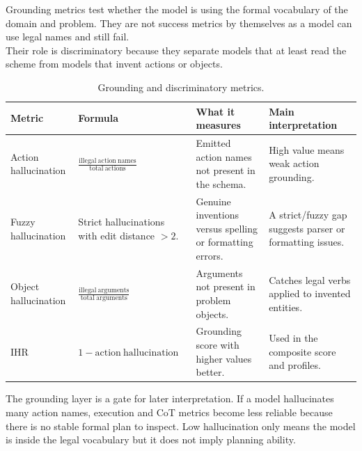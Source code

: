Grounding metrics test whether the model is using the formal vocabulary of the domain and problem. They are not success metrics by themselves as a model can use legal names and still fail.\\
Their role is discriminatory because they separate models that at least read the scheme from models that invent actions or objects.

\begin{table}[H]\small
\centering
\begin{tabularx}{\linewidth}{@{}l l Y Y@{}}
\toprule
\textbf{Metric} & \textbf{Formula} & \textbf{What it measures} & \textbf{Main interpretation}\\
\midrule
Action hallucination & \(\frac{\mathrm{illegal\ action\ names}}{\mathrm{total\ actions}}\) & Emitted action names not present in the schema. & High value means weak action grounding.\\
\addlinespace
Fuzzy hallucination & Strict hallucinations with edit distance \(>2\). & Genuine inventions versus spelling or formatting errors. & A strict/fuzzy gap suggests parser or formatting issues.\\
\addlinespace
Object hallucination & \(\frac{\mathrm{illegal\ arguments}}{\mathrm{total\ arguments}}\) & Arguments not present in problem objects. & Catches legal verbs applied to invented entities.\\
\addlinespace
IHR & \(1-\mathrm{action\ hallucination}\) & Grounding score with higher values better. & Used in the composite score and profiles.\\
\bottomrule
\end{tabularx}
\caption{Grounding and discriminatory metrics.}
\label{tab:grounding-metrics-compact}
\end{table}

The grounding layer is a gate for later interpretation. If a model hallucinates many action names, execution and CoT metrics become less reliable because there is no stable formal plan to inspect. Low hallucination only means the model is inside the legal vocabulary but it does not imply planning ability.